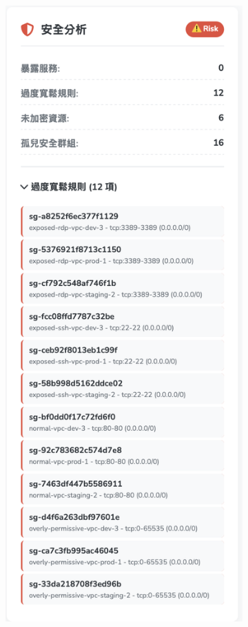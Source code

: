\documentclass[11pt,a4paper]{ctexart}
\begin{document}
\begin{figure}[H]
\centering
\begin{subfigure}[b]{0.32\textwidth}
\centering
\includegraphics[width=\textwidth]{安全分析.png}

\end{subfigure}
\end{figure}
\end{document}
